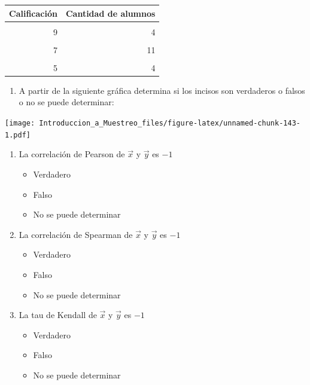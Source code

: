 \documentclass[
]{book}
\providecommand{\tightlist}{%
  \setlength{\itemsep}{0pt}\setlength{\parskip}{0pt}}
\begin{document}
\begin{table}
\centering
\begin{tabular}{r|r}
\hline
Calificación & Cantidad de alumnos\\
\hline
\cellcolor{gray!6}{10} & \cellcolor{gray!6}{3}\\
\hline
9 & 4\\
\hline
\cellcolor{gray!6}{8} & \cellcolor{gray!6}{12}\\
\hline
7 & 11\\
\hline
\cellcolor{gray!6}{6} & \cellcolor{gray!6}{1}\\
\hline
5 & 4\\
\hline
\end{tabular}
\end{table}

\begin{enumerate}
\def\labelenumi{\arabic{enumi}.}
\setcounter{enumi}{25}
\tightlist
\item
  A partir de la siguiente gráfica determina si los incisos son verdaderos o falsos o no se puede determinar:
\end{enumerate}

\texttt{[image: Introduccion\_a\_Muestreo\_files/figure-latex/unnamed-chunk-143-1.pdf]}

\begin{enumerate}
\def\labelenumi{\alph{enumi}.}
\tightlist
\item
  La correlación de Pearson de \(\vec{x}\) y \(\vec{y}\) es \(-1\)

  \begin{itemize}
  \tightlist
  \item
    Verdadero
  \item
    Falso
  \item
    No se puede determinar
  \end{itemize}
\item
  La correlación de Spearman de \(\vec{x}\) y \(\vec{y}\) es \(-1\)

  \begin{itemize}
  \tightlist
  \item
    Verdadero
  \item
    Falso\\
  \item
    No se puede determinar
  \end{itemize}
\item
  La tau de Kendall de \(\vec{x}\) y \(\vec{y}\) es \(-1\)

  \begin{itemize}
  \tightlist
  \item
    Verdadero
  \item
    Falso
  \item
    No se puede determinar
  \end{itemize}
\end{enumerate}
\end{document}
